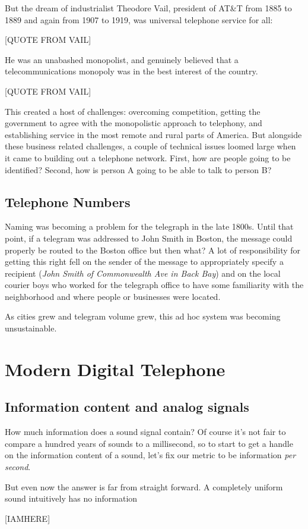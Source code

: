 \documentclass[UTF8]{book}
\begin{document}
\begin{CJK}{UTF8}{gbsn}
But the dream of industrialist Theodore Vail, president of AT\&T from 1885 to 1889 and again from 1907 to 1919, was universal telephone service for all:

[QUOTE FROM VAIL]

He was an unabashed monopolist, and genuinely believed that a telecommunications monopoly was in the best interest of the country.

[QUOTE FROM VAIL]

This created a host of challenges: overcoming competition, getting the government to agree with the monopolistic approach to telephony, and establishing service in the most remote and rural parts of America. But alongside these business related challenges, a couple of technical issues loomed large when it came to building out a telephone network. First, how are people going to be identified? Second, how is person A going to be able to talk to person B?

\section{Telephone Numbers}

Naming was becoming a problem for the telegraph in the late 1800s. Until that point, if a telegram was addressed to John Smith in Boston, the message could properly be routed to the Boston office but then what? A lot of responsibility for getting this right fell on the sender of the message to appropriately specify a recipient (\emph{John Smith of Commonwealth Ave in Back Bay}) and on the local courier boys who worked for the telegraph office to have some familiarity with the neighborhood and where people or businesses were located.

As cities grew and telegram volume grew, this ad hoc system was becoming unsustainable.


\chapter{Modern Digital Telephone}

\section{Information content and analog signals}

How much information does a sound signal contain? Of course it's not fair to compare a hundred years of sounds to a millisecond, so to start to get a handle on the information content of a sound, let's fix our metric to be information \emph{per second}.

But even now the answer is far from straight forward. A completely uniform sound intuitively has no information

[IAMHERE]




\end{CJK}
\end{document}
